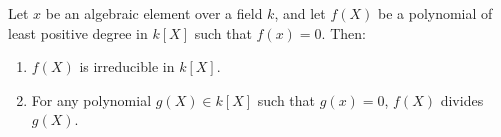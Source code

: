 Let $x$ be an algebraic element over a field $k$, and let $f(X)$ be a polynomial of least positive degree in $k[X]$ such that $f(x) = 0$. Then:
\begin{enumerate}
\item $f(X)$ is irreducible in $k[X]$.
\item For any polynomial $g(X) \in k[X]$ such that $g(x) = 0$, $f(X)$ divides $g(X)$.
\end{enumerate}
